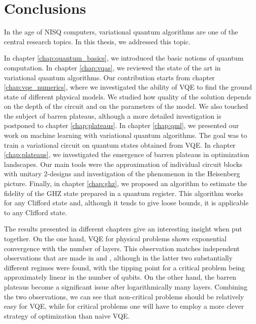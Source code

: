 \chapter*{Conclusions}


In the age of NISQ computers, variational quantum algorithms are one of the central research topics. In this thesis, we addressed this topic.

In chapter \ref{chap:quantum_basics}, we introduced the basic notions of quantum computation. In chapter \ref{chap:vqas}, we reviewed the state of the art in variational quantum algorithms. Our contribution starts from chapter \ref{chap:vqe_numerics}, where we investigated the ability of VQE to find the ground state of different physical models. We studied how quality of the solution depends on the depth of the circuit and on the parameters of the model. We also touched the subject of barren plateaus, although a more detailed investigation is postponed to chapter \ref{chap:plateaus}.
In chapter \ref{chap:qml}, we presented our work on machine learning with variational quantum algorithms. The goal was to train a variational circuit on quantum states obtained from VQE. In chapter \ref{chap:plateaus}, we investigated the emergence of barren plateaus in optimization landscapes. Our main tools were the approximation of individual circuit blocks with unitary 2-designs and investigation of the phenomenon in the Heisenberg picture.
Finally, in chapter \ref{chap:ghz}, we proposed an algorithm to estimate the fidelity of the GHZ state prepared in a quantum register. This algorithm works for any Clifford state and, although it tends to give loose bounds, it is applicable to any Clifford state.

The results presented in different chapters give an interesting insight when put together. On the one hand, VQE for physical problems shows exponential convergence with the number of layers. This observation matches independent observations that are made in \cite{cade_strategies_2019} and \cite{bravo-prieto_scaling_2020}, although in the latter two substantially different regimes were found, with the tipping point for a critical problem being approximately linear in the number of qubits. On the other hand, the barren plateaus become a significant issue after logarithmically many layers. Combining the two observations, we can see that non-critical problems should be relatively easy for VQE, while for critical problems one will have to employ a more clever strategy of optimization than naive VQE.


